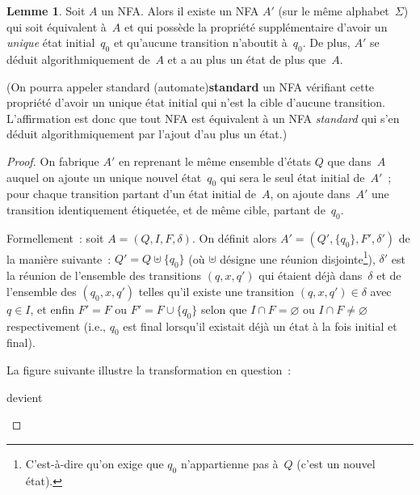 \documentclass[12pt,a4paper]{article}
\theoremstyle{definition}
\newtheorem{lem}[comcnt]{Lemme}
\newcommand{\defin}[2][]{\def\latexsucks{#1}\ifx\latexsucks\empty\index{#2}\else\index{\latexsucks}\fi\textbf{#2}}
\begin{document}
\begin{lem}\label{standard-automaton-lemma}
Soit $A$ un NFA.  Alors il existe un NFA $A'$ (sur le même
alphabet $\Sigma$) qui soit équivalent à $A$ et qui possède la
propriété supplémentaire d'avoir un \emph{unique} état initial $q_0$
et qu'aucune transition n'aboutit à $q_0$.  De plus, $A'$ se déduit
algorithmiquement de $A$ et a au plus un état de plus que $A$.

(On pourra appeler \defin[standard (automate)]{standard} un NFA
vérifiant cette propriété d'avoir un unique état initial qui n'est la
cible d'aucune transition.  L'affirmation est donc que tout NFA est
équivalent à un NFA \emph{standard} qui s'en déduit algorithmiquement
par l'ajout d'au plus un état.)
\end{lem}
\begin{proof}
On fabrique $A'$ en reprenant le même ensemble d'états $Q$ que
dans $A$ auquel on ajoute un unique nouvel état $q_0$ qui sera le seul
état initial de $A'$ ; pour chaque transition partant d'un état
initial de $A$, on ajoute dans $A'$ une transition identiquement
étiquetée, et de même cible, partant de $q_0$.

Formellement : soit $A = (Q,I,F,\delta)$.  On définit alors $A' =
(Q',\{q_0\},F',\delta')$ de la manière suivante : $Q' = Q \uplus
\{q_0\}$ (où $\uplus$ désigne une réunion
disjointe\footnote{C'est-à-dire qu'on exige que $q_0$ n'appartienne
  pas à $Q$ (c'est un nouvel état).}), $\delta'$ est la réunion de
l'ensemble des transitions $(q,x,q')$ qui étaient déjà dans $\delta$
et de l'ensemble des $(q_0,x,q')$ telles qu'il existe une transition
$(q,x,q') \in \delta$ avec $q\in I$, et enfin $F' = F$ ou $F' =
F\cup\{q_0\}$ selon que $I\cap F = \varnothing$ ou $I\cap F \neq
\varnothing$ respectivement (i.e., $q_0$ est final lorsqu'il existait
déjà un état à la fois initial et final).

La figure suivante illustre la transformation en question :
\begin{center}
\quad devient\quad
{}
\end{center}


\end{proof}
\end{document}
